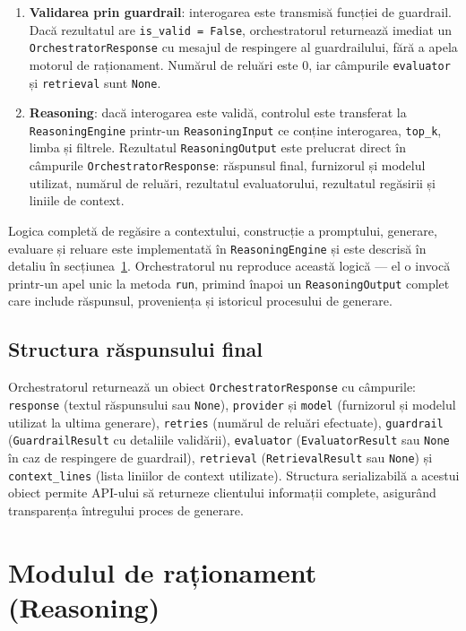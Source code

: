\documentclass[12pt, a4paper, oneside, romanian]{teza-upb}
\begin{document}
\begin{enumerate}
    \item \textbf{Validarea prin guardrail}: interogarea este transmisă funcției de guardrail. Dacă rezultatul are \texttt{is\_valid = False}, orchestratorul returnează imediat un \texttt{OrchestratorResponse} cu mesajul de respingere al guardrailului, fără a apela motorul de raționament. Numărul de reluări este 0, iar câmpurile \texttt{evaluator} și \texttt{retrieval} sunt \texttt{None}.
    \item \textbf{Reasoning}: dacă interogarea este validă, controlul este transferat la  \texttt{ReasoningEngine} printr-un \texttt{ReasoningInput} ce conține interogarea, \texttt{top\_k}, limba și filtrele. Rezultatul \texttt{ReasoningOutput} este prelucrat direct în câmpurile \texttt{OrchestratorResponse}: răspunsul final, furnizorul și modelul utilizat, numărul de reluări, rezultatul evaluatorului, rezultatul regăsirii și liniile de context.
\end{enumerate}

Logica completă de regăsire a contextului, construcție a promptului, generare, evaluare și reluare este implementată în \texttt{ReasoningEngine} și este descrisă în detaliu în secțiunea~\ref{sec:reasoning}. Orchestratorul nu reproduce această logică — el o invocă printr-un apel unic la metoda \texttt{run}, primind înapoi un \texttt{ReasoningOutput} complet care include răspunsul, proveniența și istoricul procesului de generare.

\subsection{Structura răspunsului final}

Orchestratorul returnează un obiect \texttt{OrchestratorResponse} cu câmpurile: \texttt{response} (textul răspunsului sau \texttt{None}), \texttt{provider} și \texttt{model} (furnizorul și modelul utilizat la ultima generare), \texttt{retries} (numărul de reluări efectuate), \texttt{guardrail} (\texttt{GuardrailResult} cu detaliile validării), \texttt{evaluator} (\texttt{EvaluatorResult} sau \texttt{None} în caz de respingere de guardrail), \texttt{retrieval} (\texttt{RetrievalResult} sau \texttt{None}) și \texttt{context\_lines} (lista liniilor de context utilizate). Structura serializabilă a acestui obiect permite API-ului să returneze clientului informații complete, asigurând transparența întregului proces de generare.


\section{Modulul de raționament (Reasoning)}
\label{sec:reasoning}
\end{document}
